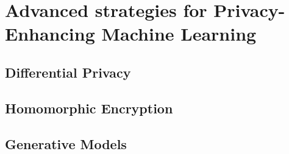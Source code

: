 \chapter{Advanced strategies for Privacy-Enhancing Machine Learning}

\section{Differential Privacy}

\section{Homomorphic Encryption}

\section{Generative Models}
